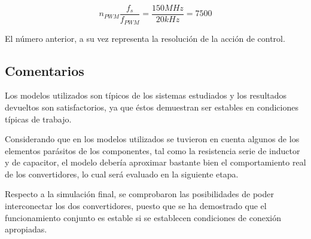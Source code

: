 $$ n_{PWM}\frac{f_s}{f_{PWM}}=\frac{150MHz}{20kHz}=7500 $$

El número anterior, a su vez representa la resolución de la acción de control.

\subsection{Comentarios}

Los modelos utilizados son típicos de los sistemas estudiados y los resultados devueltos son satisfactorios, ya que éstos demuestran ser
estables en condiciones típicas de trabajo. 

Considerando que en los modelos utilizados se tuvieron en cuenta algunos de los elementos parásitos de los componentes, tal como la resistencia
serie de inductor y de capacitor, el modelo debería aproximar bastante bien el comportamiento real de los convertidores, lo cual será evaluado
en la siguiente etapa.

Respecto a la simulación final, se comprobaron las posibilidades de poder interconectar los dos convertidores, puesto que se ha demostrado que el funcionamiento
conjunto es estable si se establecen condiciones de conexión apropiadas.

